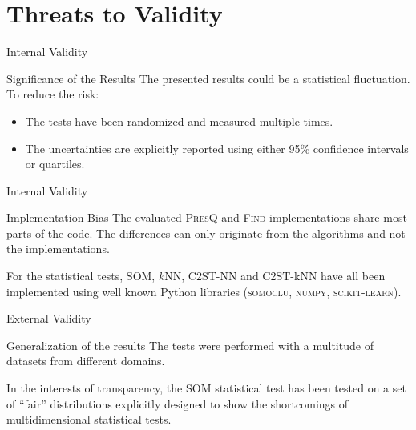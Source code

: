 \documentclass[10pt]{beamer}
\newcommand{\PresQ}[0]{\textsc{PresQ}\xspace}
\begin{document}
\section{Threats to Validity}

\begin{frame}{Internal Validity}
    \begin{alertblock}{Significance of the Results}
        \smallskip
        The presented results could be a statistical fluctuation. To reduce the risk:
        
        \begin{itemize}
            \item The tests have been randomized and measured multiple times.
            \item The uncertainties are explicitly reported using either 95\% confidence intervals or quartiles.
        \end{itemize}
    \end{alertblock}
\end{frame}

\begin{frame}{Internal Validity}
    \begin{alertblock}{Implementation Bias}
        \smallskip
        The evaluated \PresQ and \textsc{Find} implementations share most parts of the code. The differences can only originate
        from the algorithms and not the implementations.
        
        \smallskip
        
        For the statistical tests, SOM, $k$NN, C2ST-NN and C2ST-kNN have all been implemented using well known
        Python libraries (\textsc{somoclu}, \textsc{numpy}, \textsc{scikit-learn}).
    \end{alertblock}
\end{frame}

\begin{frame}{External Validity}
    \begin{alertblock}{Generalization of the results}
        \smallskip
        The tests were performed with a multitude of datasets from different domains.
        
        \smallskip

        In the interests of transparency, the SOM statistical test has been tested on a set
        of ``fair'' distributions explicitly designed to show the shortcomings of multidimensional statistical tests.
        
    \end{alertblock}
\end{frame}
\end{document}
